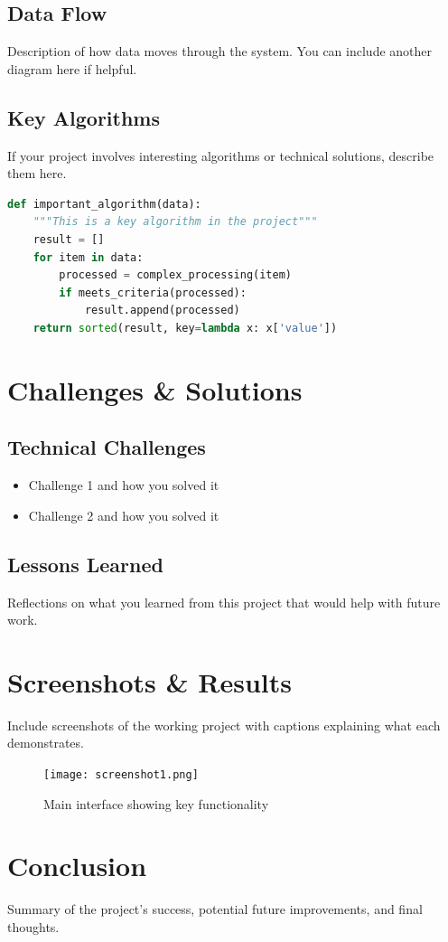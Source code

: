 \documentclass[10pt,a4paper]{article}
\begin{document}
\subsection{Data Flow}
Description of how data moves through the system. You can include another diagram here if helpful.

\subsection{Key Algorithms}
If your project involves interesting algorithms or technical solutions, describe them here.

\begin{lstlisting}[language=Python,caption=Sample code snippet]
def important_algorithm(data):
    """This is a key algorithm in the project"""
    result = []
    for item in data:
        processed = complex_processing(item)
        if meets_criteria(processed):
            result.append(processed)
    return sorted(result, key=lambda x: x['value'])
\end{lstlisting}

\section{Challenges \& Solutions}
\subsection{Technical Challenges}
\begin{itemize}
	\item Challenge 1 and how you solved it
	\item Challenge 2 and how you solved it
\end{itemize}

\subsection{Lessons Learned}
Reflections on what you learned from this project that would help with future work.

\section{Screenshots \& Results}
Include screenshots of the working project with captions explaining what each demonstrates.

\begin{figure}[h]
	\centering
	\texttt{[image: screenshot1.png]}
	\caption{Main interface showing key functionality}
	\label{fig:screenshot1}
\end{figure}

\section{Conclusion}
Summary of the project's success, potential future improvements, and final thoughts.
\end{document}
